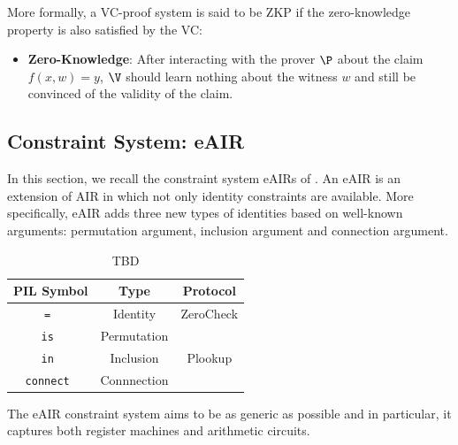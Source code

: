 More formally, a VC-proof system is said to be ZKP if the zero-knowledge property is also satisfied by the VC:
\begin{itemize}
    \item \textbf{Zero-Knowledge}: After interacting with the prover $\P$ about the claim $f(x,w) = y$, $\V$ should learn nothing about the witness $w$ and still be convinced of the validity of the claim.
\end{itemize}

\subsection{Constraint System: eAIR}

In this section, we recall the constraint system eAIRs of \cite{eSTARK}. An eAIR is an extension of AIR in which not only identity constraints are available. More specifically, eAIR adds three new types of identities based on well-known arguments: permutation argument, inclusion argument and connection argument. 

\begin{table}[H]
    \centering
    \begin{tabular}{|c|c|c|}
        \hline
        \textbf{PIL Symbol} & \textbf{Type} & \textbf{Protocol} \\\hline
        \tt{=} & Identity & ZeroCheck \\\hline
        \tt{is} & Permutation & \cite{EPRINT:GabWilCio19} \\\hline
        \tt{in} & Inclusion & Plookup \cite{EPRINT:GabWil20} \\\hline
        \tt{connect} & Connnection & \cite{EPRINT:GabWilCio19} \\\hline
    \end{tabular}
    \caption{TBD}
    \label{fig:TBDDD}
\end{table}

The eAIR constraint system aims to be as generic as possible and in particular, it captures both register machines and arithmetic circuits.

